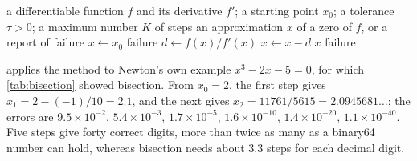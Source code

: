\begin{algorithm}
\begin{algorithmic}[1]
\Require a differentiable function $f$ and its derivative $f'$; a starting point $x_0$; a tolerance $\tau>0$; a maximum number $K$ of steps
\Ensure an approximation $x$ of a zero of $f$, or a report of failure
\State $x\gets x_0$
   \Return failure 
  \EndIf
  \State $d\gets f(x)/f'(x)$
  \State $x\gets x-d$
   \Return $x$
  \EndIf
\EndFor
\State \Return failure 
\end{algorithmic}
\caption{Newton's method. Each step replaces $f$ by its tangent at the current point and moves to the zero of the tangent.}
\label{alg:newton}
\end{algorithm}

 applies the method to Newton's own example $x^3-2x-5=0$, for which \cref{tab:bisection} showed bisection. From $x_0=2$, the first step gives $x_1=2-(-1)/10=2.1$, and the next gives $x_2=11761/5615=2.0945681\ldots$; the errors are $9.5\times10^{-2}$, $5.4\times10^{-3}$, $1.7\times10^{-5}$, $1.6\times10^{-10}$, $1.4\times10^{-20}$, $1.1\times10^{-40}$. Five steps give forty correct digits, more than twice as many as a binary64 number can hold, whereas bisection needs about $3.3$ steps for each decimal digit.

\begin{table}
\end{table}

